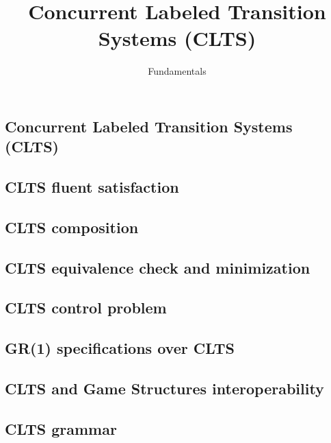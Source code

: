 \documentclass{article}
\title{Concurrent Labeled Transition Systems (CLTS)} %
\author{Fundamentals} %
\date{}
\begin{document}
\maketitle

\setcounter{section}{1} %
\setcounter{theorem}{1} %

\subsection{Concurrent Labeled Transition Systems (CLTS)}


\subsection{CLTS fluent satisfaction}


\subsection{CLTS composition}


\newpage
\subsection{CLTS equivalence check and minimization}


\newpage
\subsection{CLTS control problem}


\newpage
\subsection{GR(1) specifications over CLTS}


\newpage
\subsection{CLTS and Game Structures interoperability}


\subsection{CLTS grammar}

\newpage


\end{document}
